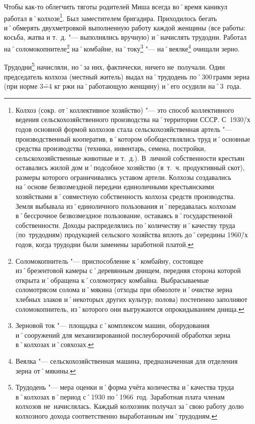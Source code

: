 Чтобы как-то облегчить тяготы родителей Миша всегда во˚время каникул работал в˚колхозе\footnote
{Колхоз (сокр. от˚коллективное хозяйство) "--- это способ коллективного ведения сельскохозяйственного производства на˚территории СССР. С~1930\=/х годов основной формой колхозов стала сельскохозяйственная артель "--- производственный кооператив, в˚котором обобществлялись труд и˚основные средства производства (техника, инвентарь, семена, постройки, сельскохозяйственные животные и т.~д.). В~личной собственности крестьян оставались жилой дом и˚подсобное хозяйство (в~т.~ч. продуктивный скот), размеры которого ограничивались уставом артели. Колхозы создавались на˚основе безвозмездной передачи единоличными крестьянскими хозяйствами в˚совместную собственность колхоза средств производства. Земля выбывала из˚единоличного пользования и˚передавалась колхозам в˚бессрочное безвозмездное пользование, оставаясь в˚государственной собственности. Доходы распределялись по˚количеству и˚качеству труда (по~трудодням) продукцией сельского хозяйства вплоть до˚середины 1960\=/х годов, когда трудодни были заменены заработной платой.}. 
Был заместителем бригадира. Приходилось бегать и˚обмерять двухметровкой выполненную работу каждой женщины (все работы: косьба, жатва и т.~д. "--- выполнялись вручную) и˚начислять трудодни. Работал на˚соломокопнителе\footnote
{Соломокопнитель "--- приспособление к˚комбайну, состоящее из˚брезентовой камеры с˚деревянным днищем, передняя сторона которой открыта и˚обращена к˚соломотрясу комбайна. Выбрасываемые соломотрясом солома и˚мякина (отходы при обмолоте и˚очистке зерна хлебных злаков и˚некоторых других культур; полова) постепенно заполняют соломокопнитель, из˚которого они выгружаются опрокидыванием днища.}
на˚комбайне, на˚току\footnote
{Зерновой ток "--- площадка с˚комплексом машин, оборудования и˚сооружений для механизированной послеуборочной обработки зерна в˚колхозах и˚совхозах.}
"--- на˚веялке\footnote
{Веялка "--- сельскохозяйственная машина, предназначенная для отделения зерна от˚мякины.} очищали зерно.

Трудодни\footnote{Трудодень "--- мера оценки и˚форма учёта количества и˚качества труда в˚колхозах в˚период с˚1930 по˚1966~год. Заработная плата членам колхозов не~начислялась. Каждый колхозник получал за˚свою работу долю колхозного дохода соответственно выработанным им˚трудодням.} начисляли, но˚за них, фактически, ничего не~получали. Один председатель колхоза (местный житель) выдал на˚трудодень по˚300\,грамм зерна (при норме 3\==4 кг ржи на˚работающую женщину) и˚его осудили на˚3~года.

